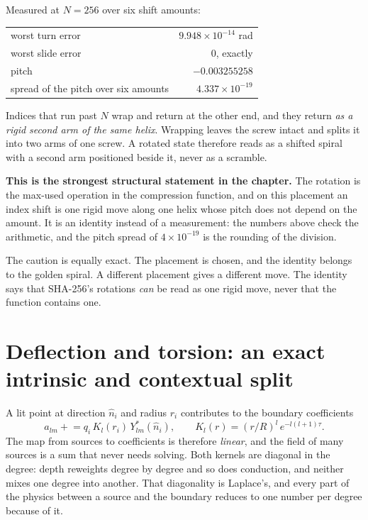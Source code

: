 Measured at \(N = 256\) over six shift amounts:

\begin{center}
\begin{tabular}{lr}
\toprule
worst turn error & \(9.948 \times 10^{-14}\) rad \\
worst slide error & \(0\), exactly \\
pitch & \(-0.003255258\) \\
spread of the pitch over six amounts & \(4.337 \times 10^{-19}\) \\
\bottomrule
\end{tabular}
\end{center}

Indices that run past \(N\) wrap and return at the other end, and they return \emph{as a rigid second arm of the same helix}. Wrapping leaves the screw intact and splits it into two arms of one screw. A rotated state therefore reads as a shifted spiral with a second arm positioned beside it, never as a scramble.

\textbf{This is the strongest structural statement in the chapter.} The rotation is the max-used operation in the compression function, and on this placement an index shift is one rigid move along one helix whose pitch does not depend on the amount. It is an identity instead of a measurement: the numbers above check the arithmetic, and the pitch spread of \(4 \times 10^{-19}\) is the rounding of the division.

The caution is equally exact. The placement is chosen, and the identity belongs to the golden spiral. A different placement gives a different move. The identity says that SHA-256's rotations \emph{can} be read as one rigid move, never that the function contains one.

\section{Deflection and torsion: an exact intrinsic and contextual split}

A lit point at direction \(\hat n_i\) and radius \(r_i\) contributes to the boundary coefficients
\[
  a_{lm} \mathrel{+}= q_i \, K_l(r_i) \, Y_{lm}^{*}(\hat n_i),
  \qquad
  K_l(r) = (r/R)^{l} \, e^{-l(l+1)\tau}.
\]
The map from sources to coefficients is therefore \emph{linear}, and the field of many sources is a sum that never needs solving. Both kernels are diagonal in the degree: depth reweights degree by degree and so does conduction, and neither mixes one degree into another. That diagonality is Laplace's, and every part of the physics between a source and the boundary reduces to one number per degree because of it.

